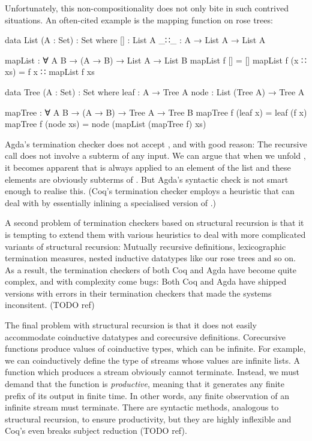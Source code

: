 Unfortunately, this non-compositionality does not only bite in such contrived
situations. An often-cited example is the mapping function on rose trees:
\begin{code}
  data List (A : Set) : Set where
    []  : List A
    _∷_ : A → List A → List A

  mapList : ∀ {A B} → (A → B) → List A → List B
  mapList f []       = []
  mapList f (x ∷ xs) = f x ∷ mapList f xs

  data Tree (A : Set) : Set where
    leaf : A → Tree A
    node : List (Tree A) → Tree A

  mapTree : ∀ {A B} → (A → B) → Tree A → Tree B
  mapTree f (leaf x)  = leaf (f x)
  mapTree f (node xs) = node (mapList (mapTree f) xs)
\end{code}
Agda's termination checker does not accept , and with good
reason: The recursive call does not involve a subterm of any input. We can argue
that when we unfold , it becomes apparent that  is
always applied to an element of the list  and these elements are
obviously subterms of . But Agda's syntactic check is not smart enough
to realise this. (Coq's termination checker employs a heuristic that can deal
with  by essentially inlining a specialised version of
.)

A second problem of termination checkers based on structural recursion is that
it is tempting to extend them with various heuristics to deal with more
complicated variants of structural recursion: Mutually recursive definitions,
lexicographic termination measures, nested inductive datatypes like our rose
trees and so on. As a result, the termination checkers of both Coq and Agda have
become quite complex, and with complexity come bugs: Both Coq and Agda have
shipped versions with errors in their termination checkers that made the systems
inconsitent. (TODO ref)

The final problem with structural recursion is that it does not easily
accommodate coinductive datatypes and corecursive definitions. Corecursive
functions produce values of coinductive types, which can be infinite. For
example, we can coinductively define the type of streams whose values are
infinite lists. A function which produces a stream obviously cannot terminate.
Instead, we must demand that the function is \emph{productive}, meaning that it
generates any finite prefix of its output in finite time. In other words, any
finite observation of an infinite stream must terminate. There are syntactic
methods, analogous to structural recursion, to ensure productivity, but they are
highly inflexible and Coq's even breaks subject reduction (TODO ref).

